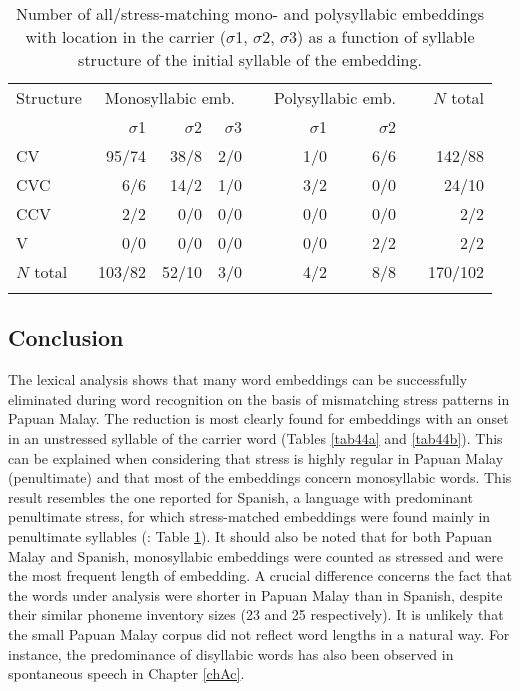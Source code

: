 \begin{table}
\caption{Number of all/stress-matching mono- and polysyllabic embeddings with location in the carrier ($\sigma$1, $\sigma$2, $\sigma$3) as a function of syllable structure of the initial syllable of the embedding.}
\label{tab45}
\begin{tabularx}{\textwidth}{l rrr r rr r r}
\lsptoprule
Structure & \multicolumn{3}{c}{Monosyllabic emb.} & & \multicolumn{2}{c}{Polysyllabic emb.} & & $N$ total\\
\cmidrule{2-4} \cmidrule{6-7}
& $\sigma$1 & $\sigma$2 & $\sigma$3 & & $\sigma$1 & $\sigma$2 & \\
\midrule
CV & 95/74 & 38/8 & 2/0 & & 1/0 & 6/6 & & 142/88\\
CVC & 6/6 & 14/2 & 1/0 & & 3/2 & 0/0 & & 24/10\\
CCV & 2/2 & 0/0 & 0/0 & & 0/0 & 0/0 & & 2/2\\
V & 0/0 & 0/0 & 0/0 & & 0/0 & 2/2 & & 2/2\\
\midrule
$N$ total & 103/82 & 52/10 & 3/0 & & 4/2 & 8/8 & & 170/102\\
\lspbottomrule
\end{tabularx}
\end{table}

\subsection{Conclusion} \label{sec422}
The lexical analysis shows that many word embeddings can be successfully eliminated during word recognition on the basis of mismatching stress patterns in Papuan Malay. The reduction is most clearly found for embeddings with an onset in an unstressed syllable of the carrier word (Tables \ref{tab44a} and \ref{tab44b}). This can be explained when considering that stress is highly regular in Papuan Malay (penultimate) and that most of the embeddings concern monosyllabic words. This result resembles the one reported for Spanish, a language with predominant penultimate stress, for which stress-matched embeddings were found mainly in penultimate syllables (\citealt{cutler_phonemic_2004}: Table \ref{tab45}). It should also be noted that for both Papuan Malay and Spanish, monosyllabic embeddings were counted as stressed and were the most frequent length of embedding. A crucial difference concerns the fact that the words under analysis were shorter in Papuan Malay than in Spanish, despite their similar phoneme inventory sizes (23 and 25 respectively). It is unlikely that the small Papuan Malay corpus did not reflect word lengths in a natural way. For instance, the predominance of disyllabic words has also been observed in spontaneous speech in Chapter \ref{chAc}.\par

